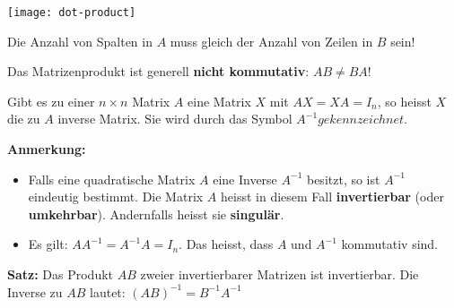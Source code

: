 \texttt{[image: dot-product]}

Die Anzahl von Spalten in $A$ muss gleich der Anzahl von Zeilen in $B$ sein!

Das Matrizenprodukt ist generell \textbf{nicht kommutativ}: $AB \neq BA$!


Gibt es zu einer $n \times n$ Matrix $A$ eine Matrix $X$ mit $AX = XA = I_n$, so heisst $X$ die zu $A$ inverse Matrix.
Sie wird durch das Symbol $A^{-1} gekennzeichnet.$

\textbf{Anmerkung:}
\begin{itemize}
    \item Falls eine quadratische Matrix $A$ eine Inverse $A^{-1}$ besitzt, so ist $A^{-1}$ eindeutig bestimmt.
    Die Matrix $A$ heisst in diesem Fall \textbf{invertierbar} (oder \textbf{umkehrbar}).
    Andernfalls heisst sie \textbf{singulär}.
    \item Es gilt: $AA^{-1} = A^{-1}A = I_n$.
    Das heisst, dass $A$ und $A^{-1}$ kommutativ sind.
\end{itemize}

\textbf{Satz:} Das Produkt $AB$ zweier invertierbarer Matrizen ist invertierbar.
Die Inverse zu $AB$ lautet: $(AB)^{-1} = B^{-1} A^{-1}$


